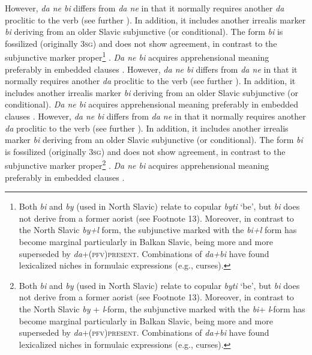 \documentclass[output=paper,colorlinks,citecolor=brown]{langscibook}
\begin{document}
 However, \textit{da ne bi} differs from \textit{da ne} in that it normally requires another \textit{da} proclitic to the verb (see further ). In addition, it includes another irrealis marker \textit{bi} deriving from an older Slavic subjunctive (or conditional). The form \textit{bi} is fossilized (originally \textsc{3sg}) and does not show agreement, in contrast to the subjunctive marker proper\footnote{Both \textit{bi} and \textit{by} (used in North Slavic) relate to copular \textit{byti} `be', but \textit{bi} does not derive from a former aorist (see Footnote 13). Moreover, in contrast to the North Slavic \textit{by+l} form, the subjunctive marked with the \textit{bi+l} form has become marginal particularly in Balkan Slavic, being more and more superseded by \textit{da}+\textsc{(pfv)present}. Combinations of \textit{da+bi} have found lexicalized niches in formulaic expressions (e.g., curses).} \citep[147]{Ivanova2014}. \textit{Da ne bi} acquires apprehensional meaning preferably in embedded clauses \citep[143]{Ivanova2014}.
\noindent However, \textit{da ne bi} differs from \textit{da ne} in that it normally requires another \textit{da} proclitic to the verb (see further ). In addition, it includes another irrealis marker \textit{bi} deriving from an older Slavic subjunctive (or conditional). \textit{Da ne bi} acquires apprehensional meaning preferably in embedded clauses \citep[143]{Ivanova2014}.
\noindent However, \textit{da ne bi} differs from \textit{da ne} in that it normally requires another \textit{da} proclitic to the verb (see further ). In addition, it includes another irrealis marker \textit{bi} deriving from an older Slavic subjunctive (or conditional). The form \textit{bi} is fossilized (originally \textsc{3sg}) and does not show agreement, in contrast to the subjunctive marker proper\footnote{Both \textit{bi} and \textit{by} (used in North Slavic) relate to copular \textit{byti} `be', but \textit{bi} does not derive from a former aorist (see Footnote 13). Moreover, in contrast to the North Slavic \textit{by} + \textit{l}-form, the subjunctive marked with the \textit{bi}+ \textit{l}-form has become marginal particularly in Balkan Slavic, being more and more superseded by \textit{da}+\textsc{(pfv)present}. Combinations of \textit{da+bi} have found lexicalized niches in formulaic expressions (e.g., curses).} \citep[147]{Ivanova2014}. \textit{Da ne bi} acquires apprehensional meaning preferably in embedded clauses \citep[143]{Ivanova2014}.
\end{document}
